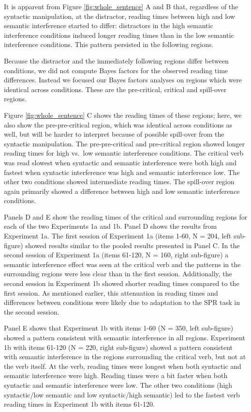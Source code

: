 \documentclass[review,preprint,12pt,authoryear,floatsintext]{elsarticle}
\begin{document}
It is apparent from Figure \ref{fig:whole_sentence} A and B that, regardless of the syntactic manipulation, at the distractor, reading times between high and low semantic interference started to differ: distractors in the high semantic interference conditions induced longer reading times than in the low semantic interference conditions. This pattern persisted in the following regions.

Because the distractor and the immediately following regions differ between conditions, we did not compute Bayes factors for the observed reading time differences. Instead we focused our Bayes factors analyses on regions which were identical across conditions. These are the pre-critical, critical and spill-over regions.

Figure \ref{fig:whole_sentence} C shows the reading times of these regions; here, we also show the pre-pre-critical region, which was identical across conditions as well, but will be harder to interpret because of possible spill-over from the syntactic manipulation. The pre-pre-critical and pre-critical region showed longer reading times for high vs.\ low semantic interference conditions. The critical verb was read slowest when syntactic and semantic interference were both high and fastest when syntactic interference was high and semantic interference low. The other two conditions showed intermediate reading times. The spill-over region again primarily showed a difference between high and low semantic interference conditions. 

Panels D and E show the reading times of the critical and surrounding regions for each of the two Experiments 1a and 1b. Panel D shows the results from Experiment 1a. The first session of Experiment 1a (items 1-60, N = 204, left sub-figure) showed results similar to the pooled results presented in Panel C. In the second session of Experiment 1a (items 61-120, N = 160, right sub-figure) a semantic interference effect was seen at the critical verb and the patterns in the surrounding regions were less clear than in the first session. Additionally, the second session in Experiment 1b showed shorter reading times compared to the first session. As mentioned earlier, this attenuation in reading times and differences between conditions were likely due to adaptation to the SPR task in the second session. 

Panel E shows that Experiment 1b with items 1-60 (N = 350, left sub-figure) showed a pattern consistent with semantic interference in all regions. Experiment 1b with items 61-120 (N = 220, right sub-figure) showed a pattern consistent with semantic interference in the regions surrounding the critical verb, but not at the verb itself. At the verb, reading times were longest when both syntactic and semantic interference were high. Reading times were a bit faster when both syntactic and semantic interference were low. The other two conditions (high syntactic/low semantic and low syntactic/high semantic) led to the fastest verb reading times in Experiment 1b with items 61-120. 
\end{document}
